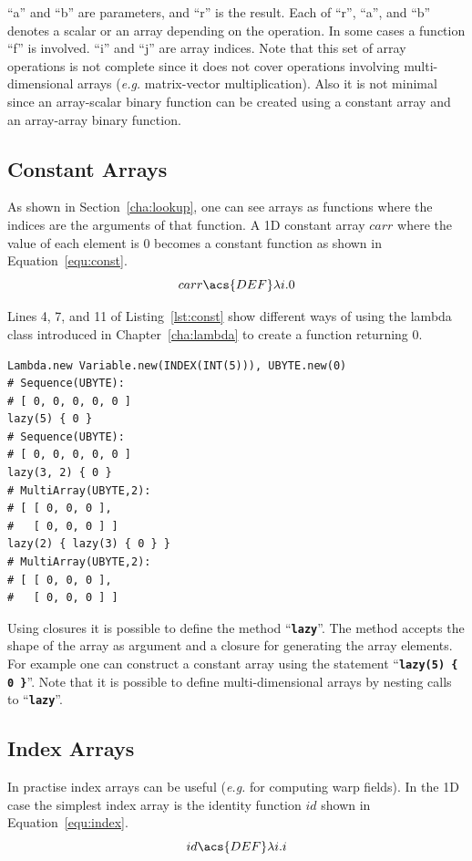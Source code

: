 \documentclass[12pt,a4paper,oneside,openright]{book}
\newcommand{\eg}{\emph{e.g.} }
\newcommand{\Eg}{For ex\-am\-ple }
\newcommand{\cha}[1]{Chapter~\ref{cha:#1}}
\newcommand{\sct}[1]{Section~\ref{cha:#1}}
\newcommand{\equ}[1]{Equation~\ref{equ:#1}}
\newcommand{\lst}[1]{Listing~\ref{lst:#1}}
\newcommand{\code}[1]{``\texttt{\textbf{\textcolor{codegray}{\small{#1}}}}''}
\begin{document}
\begin{CJK}{UTF8}{}
\begin{table}[t]
\begin{center}
\begin{tabular}{ll@{=}lc}
    \end{tabular}
  \end{center}
\end{table}
``a'' and ``b'' are parameters, and ``r'' is the result. Each of ``r'', ``a'', and ``b'' denotes a scalar or an array depending on the operation. In some cases a function ``f'' is involved. ``i'' and ``j'' are array indices. Note that this set of array operations is not complete since it does not cover operations involving multi-dimensional arrays (\eg matrix-vector multiplication). Also it is not minimal since an array-scalar binary function can be created using a constant array and an array-array binary function.

\subsection{Constant Arrays}\label{cha:const}
As shown in \sct{lookup}, one can see arrays as functions where the indices are the arguments of that function. A \ac{1D} constant array $carr$ where the value of each element is $0$ becomes a constant function as shown in \equ{const}.
\begin{equation}\label{equ:const}
  carr\acs{DEF}\lambda i.0
\end{equation}

Lines 4, 7, and 11 of \lst{const} show different ways of using the lambda class introduced in \cha{lambda} to create a function returning $0$.
\lstset{language=Ruby,frame=single,numbers=left}
\begin{lstlisting}[float=htbp,caption={Constant arrays},escapechar=\$,label=lst:const]
Lambda.new Variable.new(INDEX(INT(5))), UBYTE.new(0)
# Sequence(UBYTE):
# [ 0, 0, 0, 0, 0 ]
lazy(5) { 0 }
# Sequence(UBYTE):
# [ 0, 0, 0, 0, 0 ]
lazy(3, 2) { 0 }
# MultiArray(UBYTE,2):
# [ [ 0, 0, 0 ],
#   [ 0, 0, 0 ] ]
lazy(2) { lazy(3) { 0 } }
# MultiArray(UBYTE,2):
# [ [ 0, 0, 0 ],
#   [ 0, 0, 0 ] ]
\end{lstlisting}
Using closures it is possible to define the method \code{lazy}. The method accepts the shape of the array as argument and a closure for generating the array elements. \Eg one can construct a constant array using the statement \code{lazy(5) \{ 0 \}}. Note that it is possible to define multi-dimensional arrays by nesting calls to \code{lazy}.

\subsection{Index Arrays}
In practise index arrays can be useful (\eg for computing warp fields). In the \ac{1D} case the simplest index array is the identity function $id$ shown in \equ{index}.
\begin{equation}\label{equ:index}
  id\acs{DEF}\lambda i.i
\end{equation}


\end{CJK}
\end{document}
